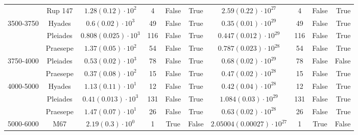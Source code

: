 \begin{tabular}{lccccccccr}
          & Rup 147 &    $1.28\left(0.12\right)\cdot 10^{2}$ &              4 &           False &            True &        $2.59\left(0.22\right)\cdot 10^{27}$ &                4 &             False &              True \\
3500-3750 & Hyades &     $0.6\left(0.02\right)\cdot 10^{3}$ &             49 &           False &            True &        $0.35\left(0.01\right)\cdot 10^{29}$ &               49 &             False &              True \\
          & Pleiades &  $0.808\left(0.025\right)\cdot 10^{3}$ &            116 &           False &            True &      $0.447\left(0.012\right)\cdot 10^{29}$ &              116 &             False &              True \\
          & Praesepe &    $1.37\left(0.05\right)\cdot 10^{2}$ &             54 &           False &            True &      $0.787\left(0.023\right)\cdot 10^{28}$ &               54 &             False &              True \\
3750-4000 & Pleiades &    $0.53\left(0.02\right)\cdot 10^{3}$ &             78 &           False &            True &        $0.68\left(0.02\right)\cdot 10^{29}$ &               78 &             False &             False \\
          & Praesepe &    $0.37\left(0.08\right)\cdot 10^{2}$ &             15 &           False &            True &        $0.47\left(0.02\right)\cdot 10^{28}$ &               15 &             False &              True \\
4000-5000 & Hyades &    $1.13\left(0.11\right)\cdot 10^{1}$ &             12 &           False &            True &        $0.42\left(0.04\right)\cdot 10^{28}$ &               12 &             False &              True \\
          & Pleiades &   $0.41\left(0.013\right)\cdot 10^{3}$ &            131 &           False &            True &       $1.084\left(0.03\right)\cdot 10^{29}$ &              131 &             False &              True \\
          & Praesepe &    $1.47\left(0.07\right)\cdot 10^{1}$ &             26 &           False &            True &        $0.63\left(0.02\right)\cdot 10^{28}$ &               26 &             False &              True \\
5000-6000 & M67 &     $2.19\left(0.3\right)\cdot 10^{0}$ &              1 &            True &           False &  $2.05004\left(0.00027\right)\cdot 10^{27}$ &                1 &              True &             False \\

\end{tabular}
